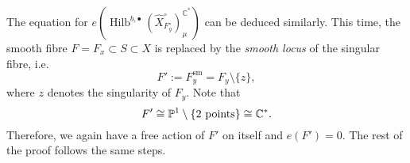 \documentclass{amsart}
\theoremstyle{definition}
\newcommand{\CC} {\mathbb{C}}          %
\newcommand{\PP} {\mathbb{P}}
\newcommand{\Hilb}{\operatorname{Hilb}}
\newcommand{\sm}{\operatorname{sm}}
\newcommand{\Xhat}{\widehat{X}}
\begin{document}
The equation for $e(\Hilb^{b,\bullet}(\Xhat ^{\circ}_{F_{y}^{\circ}})_{\mu}^{\CC^*})$ can be deduced similarly. This time, the smooth fibre $F = F_x \subset S \subset X$ is replaced by the \emph{smooth locus} of the singular fibre, i.e.~ 
$$
F' := F_{y}^{\sm} = F_{y} \setminus \{z\},
$$
where $z$ denotes the singularity of $F_y$. Note that
$$
F' \cong \PP^1 \setminus \{2 \ \rm{points}\} \cong \CC^*.
$$
Therefore, we again have a free action of $F'$ on itself and $e(F') = 0$. The rest of the proof follows the same steps.
\end{document}
